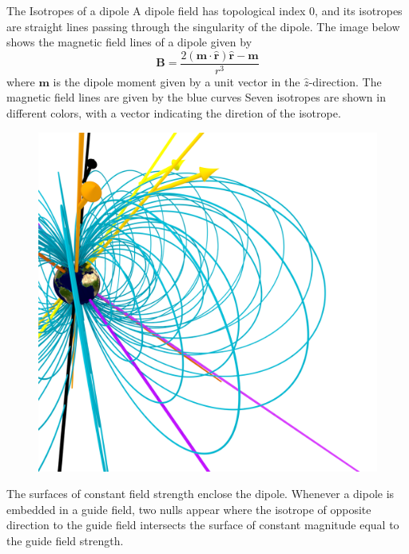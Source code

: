 \documentclass[final]{beamer}
\newlength{\twocolwid}
\begin{document}
\begin{frame}[t]
\begin{columns}[t]
\begin{column}{\twocolwid}
\begin{block}{The Isotropes of a dipole}
    A dipole field has topological index 0, and its isotropes are straight lines passing through
	the singularity of the dipole. 
	The image below shows the magnetic field lines of a dipole given by
	\begin{equation}
		\mathbf{B} = \frac{2(\mathbf{m}\cdot\hat{\mathbf{r}})\hat{\mathbf{r}}-\mathbf{m}}
		{r^3}
	\end{equation}
	where $\mathbf{m}$ is the dipole moment given by a unit vector in the
	$\hat{z}$-direction. 
	The magnetic field lines are given by the blue curves
	Seven isotropes are shown in different colors, with a vector indicating the diretion of the
	isotrope. 
    \begin{figure}
        \includegraphics[width=\twocolwid]{fig/mainfig.png}
    \end{figure}
	The surfaces of constant field strength enclose the dipole. 
	Whenever a dipole is embedded in a guide field, two nulls appear where the isotrope of
	opposite direction to the guide field intersects the surface of constant magnitude
	equal to the guide field strength. 
\end{block}

\begin{columns}[t,totalwidth=\twocolwid] %


\end{columns}
\end{column}
\end{columns}
\end{frame}
\end{document}
